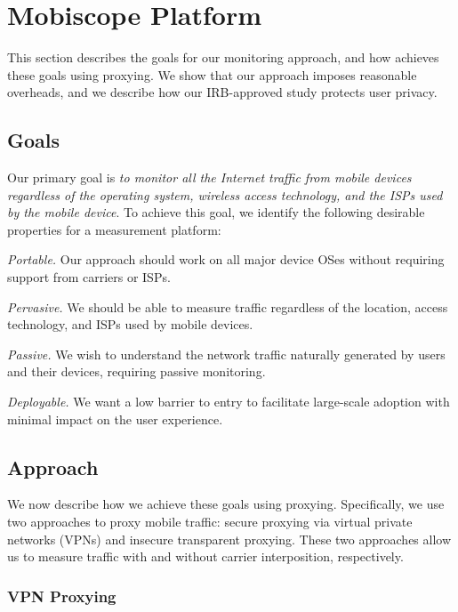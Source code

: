 \section{Mobiscope Platform}
\label{sec:platform}

This section describes the goals for our monitoring approach, and how \platname achieves these goals using proxying.
We show that our approach imposes reasonable overheads, and we describe how our IRB-approved study protects user privacy.

\subsection{Goals}
\label{sec:goals}
Our primary goal is \emph{to monitor all the Internet traffic from mobile devices regardless of the operating system, wireless access technology, and the ISPs used by the mobile device}.
To achieve this goal, we identify the following desirable properties for a measurement platform:
\begin{packedenumerate}
\item \emph{Portable.} Our approach should work on all major device OSes without requiring support from carriers or ISPs.
\item \emph{Pervasive.} We should be able to measure traffic regardless of the location, access technology, and ISPs used by mobile devices.
\item \emph{Passive.} We wish to understand the network traffic naturally generated by users and their devices, requiring passive monitoring.
\item \emph{Deployable.} We want a low barrier to entry to facilitate large-scale adoption with minimal impact on the user experience. 
\end{packedenumerate}

\subsection{Approach}

We now describe how we achieve these goals using proxying. 
Specifically, we use two approaches to proxy mobile traffic: secure proxying via virtual private networks (VPNs) and insecure transparent proxying. 
These two approaches allow us to measure traffic with and without carrier interposition, respectively. 

\subsubsection{VPN Proxying}
\label{sec:platform-vpn}

